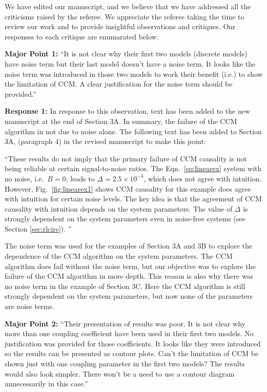 \documentclass[twocolumn,aps,pre,groupedaddress]{revtex4-1}
\begin{document}
%


\newpage 
We have edited our manuscript, and we believe that we have addressed all the criticisms raised by the referee.  We appreciate the referee taking the time to review our work and to provide insightful observations and critiques.  Our responses to each critique are enumarated below.\newline

\textbf{Major Point 1:} ``It is not clear why their first two models (discrete models) have noise term but their last model doesn't have a noise term. It looks like the noise term was introduced in those two models to work their benefit (i.e.) to show the limitation of CCM. A clear justification for the noise term should be provided.''

\textbf{Response 1:} In response to this observation, text has been added to the new manuscript at the end of Section 3A.  In summary, the failure of the CCM algorithm in not due to noise alone.  The following text has been added to Section 3A, (paragraph 4) in the revised manuscript to make this point:\newline

``These results do not imply that the primary failure of CCM causality is not being reliable at certain signal-to-noise ratios.  The Eqn.\ \ref{eq:linearex} system with no noise, i.e.\ $B=0$, leads to $\Delta=2.5\times 10^{-3}$, which does not agree with intuition.  However, Fig.\ \ref{fig:linearex1} shows CCM causality for this example does agree with intuition for certain noise levels.  The key idea is that the agreement of CCM causality with intuition depends on the system parameters.  The value of $\Delta$ is strongly dependent on the system parameters even in noise-free systems (see Section \ref{sec:rlcirc}). ''\newline

The noise term was used for the examples of Section 3A and 3B to explore the dependence of the CCM algorithm on the system parameters.  The CCM algorithm does fail without the noise term, but our objective was to explore the failure of the CCM algorithm in more depth.  This reason is also why there was no noise term in the example of Section 3C.  Here the CCM algorithm is still strongly dependent on the system parameters, but now none of the parameters are noise terms. \newline

\textbf{Major Point 2:} ``Their presentation of results was poor. It is not clear why more than one coupling coefficient have been used in their first two models. No justification was provided for those coefficients. It looks like they were introduced so the results can be presented as contour plots.  Can't the limitation of CCM be shown just with one coupling parameter in the first two models? The results would also look simpler. There won't be a need to use a contour diagram unnecessarily in this case.''
\end{document}

